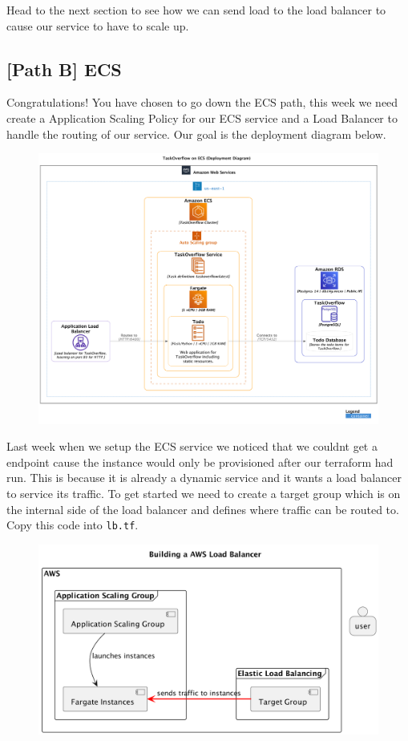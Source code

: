 \documentclass{csse4400}
\begin{document}
Head to the next section to see how we can send load to the load balancer to cause our service to have to scale up.
\subsection{[Path B] ECS}

Congratulations! You have chosen to go down the ECS path, this week we need create a Application Scaling Policy for our ECS service and a Load Balancer to handle the routing of our service. Our goal is the deployment diagram below.

\begin{figure}[H]
  \includegraphics[width=\textwidth]{diagrams/ecsdeployment}
\end{figure}

Last week when we setup the ECS service we noticed that we couldnt get a endpoint cause the instance would only be provisioned after our terraform had run. This is because it is already a dynamic service and it wants a load balancer to service its traffic. To get started we need to create a target group which is on the internal side of the load balancer and defines where traffic can be routed to. Copy this code into \texttt{lb.tf}.

\begin{figure}[H]
  \begin{center}
    \includegraphics[scale=0.2]{diagrams/lb2fargate}
  \end{center}
\end{figure}
\end{document}
